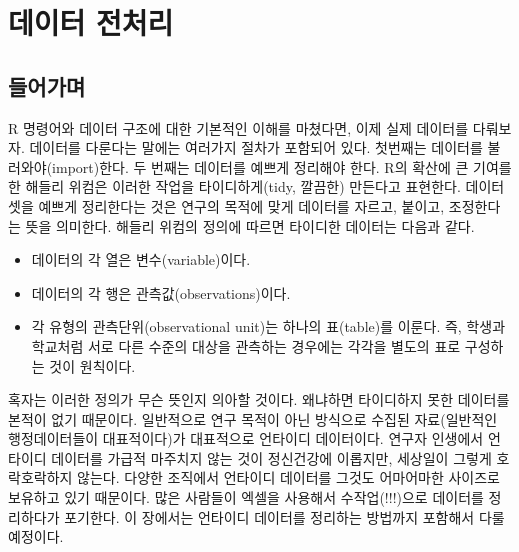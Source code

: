 \documentclass[
]{book}
\newenvironment{Shaded}{\begin{snugshade}}{\end{snugshade}}
\newcommand{\AttributeTok}[1]{\textcolor[rgb]{0.13,0.29,0.53}{#1}}
\newcommand{\CommentTok}[1]{\textcolor[rgb]{0.56,0.35,0.01}{\textit{#1}}}
\newcommand{\DecValTok}[1]{\textcolor[rgb]{0.00,0.00,0.81}{#1}}
\newcommand{\DocumentationTok}[1]{\textcolor[rgb]{0.56,0.35,0.01}{\textbf{\textit{#1}}}}
\newcommand{\FunctionTok}[1]{\textcolor[rgb]{0.13,0.29,0.53}{\textbf{#1}}}
\newcommand{\NormalTok}[1]{#1}
\newcommand{\SpecialCharTok}[1]{\textcolor[rgb]{0.81,0.36,0.00}{\textbf{#1}}}
\providecommand{\tightlist}{%
  \setlength{\itemsep}{0pt}\setlength{\parskip}{0pt}}
\begin{document}
\begin{Shaded}
\end{Shaded}

\chapter{데이터 전처리}\label{literature}

\section{들어가며}\label{uxb4e4uxc5b4uxac00uxba70}

R 명령어와 데이터 구조에 대한 기본적인 이해를 마쳤다면, 이제 실제 데이터를 다뤄보자. 데이터를 다룬다는 말에는 여러가지 절차가 포함되어 있다. 첫번째는 데이터를 불러와야(import)한다. 두 번째는 데이터를 예쁘게 정리해야 한다. R의 확산에 큰 기여를 한 해들리 위컴은 이러한 작업을 타이디하게(tidy, 깔끔한) 만든다고 표현한다. 데이터셋을 예쁘게 정리한다는 것은 연구의 목적에 맞게 데이터를 자르고, 붙이고, 조정한다는 뜻을 의미한다. 해들리 위컴의 정의에 따르면 타이디한 데이터는 다음과 같다.

\begin{itemize}
\tightlist
\item
  데이터의 각 열은 변수(variable)이다.
\item
  데이터의 각 행은 관측값(observations)이다.
\item
  각 유형의 관측단위(observational unit)는 하나의 표(table)를 이룬다. 즉, 학생과 학교처럼 서로 다른 수준의 대상을 관측하는 경우에는 각각을 별도의 표로 구성하는 것이 원칙이다.
\end{itemize}

혹자는 이러한 정의가 무슨 뜻인지 의아할 것이다. 왜냐하면 타이디하지 못한 데이터를 본적이 없기 때문이다. 일반적으로 연구 목적이 아닌 방식으로 수집된 자료(일반적인 행정데이터들이 대표적이다)가 대표적으로 언타이디 데이터이다. 연구자 인생에서 언타이디 데이터를 가급적 마주치지 않는 것이 정신건강에 이롭지만, 세상일이 그렇게 호락호락하지 않는다. 다양한 조직에서 언타이디 데이터를 그것도 어마어마한 사이즈로 보유하고 있기 때문이다. 많은 사람들이 엑셀을 사용해서 수작업(!!!)으로 데이터를 정리하다가 포기한다. 이 장에서는 언타이디 데이터를 정리하는 방법까지 포함해서 다룰 예정이다.
\end{document}
